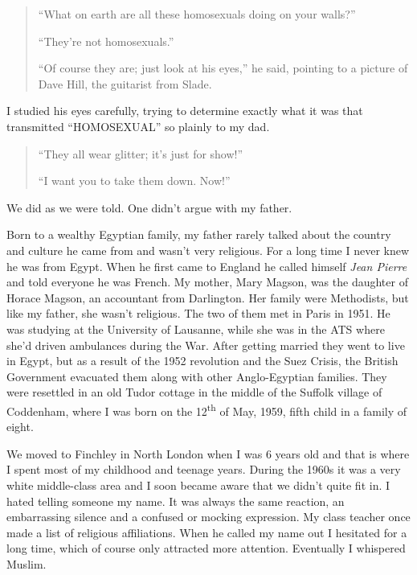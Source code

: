 \documentclass[12pt]{memoir}
\let \Sup=\textsuperscript
\begin{document}
\begin{quote}
“What on earth are all these homosexuals doing on your walls?”

“They’re not homosexuals.”

“Of course they are; just look at his eyes,”
he said, pointing to a picture of Dave Hill, the guitarist from Slade.
\end{quote}

I studied his eyes carefully, trying to determine exactly what it was
that transmitted “HOMOSEXUAL” so plainly to my dad.

\begin{quote}
“They all wear glitter; it’s just for show!”

“I want you to take them down. Now!”
\end{quote}

We did as we were told.
One didn’t argue with my father.


Born to a wealthy Egyptian family,
my father rarely talked about the country
and culture he came from and wasn’t very religious.
For a long time I never knew he was from Egypt.
When he first came to England he called himself \emph{Jean Pierre}
and told everyone he was French.
My mother, Mary Magson, was the daughter of Horace Magson,
an accountant from Darlington.
Her family were Methodists, but like my father, she wasn’t religious.
The two of them met in Paris in 1951.
He was studying at the University of Lausanne,
while she was in the ATS where she’d driven ambulances during the War.
After getting married they went to live in Egypt,
but as a result of the 1952 revolution and the Suez Crisis,
the British Government evacuated them
along with other Anglo-Egyptian families.
They were resettled in an old Tudor cottage in the middle
of the Suffolk village of Coddenham,
where I was born on the 12\Sup{th} of May, 1959,
fifth child in a family of eight.


We moved to Finchley in North London when I was 6 years old
and that is where I spent most of my childhood and teenage years.
During the 1960s it was a very white middle-class area
and I soon became aware that we didn’t quite fit in.
I hated telling someone my name.
It was always the same reaction,
an embarrassing silence and a confused or mocking expression.
My class teacher once made a list of religious affiliations.
When he called my name out I hesitated for a long time,
which of course only attracted more attention.
Eventually I whispered Muslim.
\end{document}
